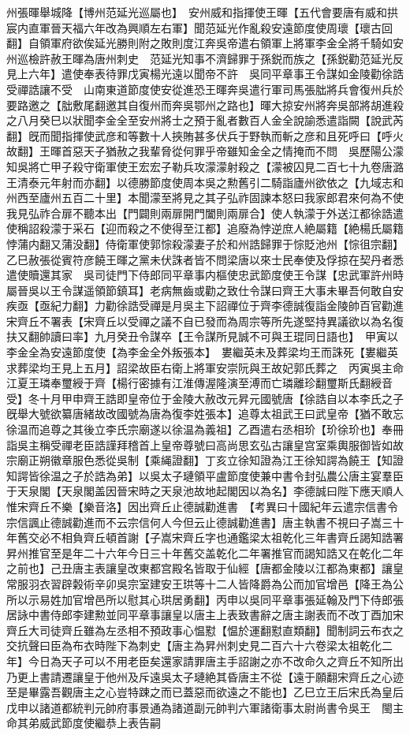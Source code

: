 州張暉舉城降【博州范延光巡屬也】　安州威和指揮使王暉【五代會要唐有威和拱宸内直軍晉天福六年改為興順左右軍】聞范延光作亂殺安遠節度使周瓌【瓌古回翻】自領軍府欲俟延光勝則附之敗則度江奔吳帝遣右領軍上將軍李金全將千騎如安州巡檢許赦王暉為唐州刺史　范延光知事不濟歸罪于孫鋭而族之【孫鋭勸范延光反見上六年】遣使奉表待罪戊寅楊光遠以聞帝不許　吳同平章事王令謀如金陵勸徐誥受禪誥讓不受　山南東道節度使安從進恐王暉奔吳遣行軍司馬張朏將兵會復州兵於要路邀之【朏敷尾翻邀其自復州而奔吳鄂州之路也】暉大掠安州將奔吳部將胡進殺之八月癸巳以狀聞李金全至安州將士之預于亂者數百人金全說諭悉遣詣闕【說武芮翻】旣而聞指揮使武彦和等數十人挾賄甚多伏兵于野執而斬之彦和且死呼曰【呼火故翻】王暉首惡天子猶赦之我輩脅從何罪乎帝雖知金全之情掩而不問　吳歷陽公濛知吳將亡甲子殺守衛軍使王宏宏子勒兵攻濛濛射殺之【濛被囚見二百七十九卷唐潞王清泰元年射而亦翻】以德勝節度使周本吳之勲舊引二騎詣廬州欲依之【九域志和州西至廬州五百二十里】本聞濛至將見之其子弘祚固諫本怒曰我家郎君來何為不使我見弘祚合扉不聽本出【門闢則兩扉開門闔則兩扉合】使人執濛于外送江都徐誥遣使稱詔殺濛于采石【迎而殺之不使得至江都】追廢為悖逆庶人絶屬籍【絶楊氏屬籍悖蒲内翻又蒲没翻】侍衛軍使郭悰殺濛妻子於和州誥歸罪于悰貶池州【悰徂宗翻】　乙巳赦張從賓符彦饒王暉之黨未伏誅者皆不問梁唐以來士民奉使及俘掠在契丹者悉遣使贖還其家　吳司徒門下侍郎同平章事内樞使忠武節度使王令謀【忠武軍許州時屬晉吳以王令謀遥領節鎮耳】老病無齒或勸之致仕令謀曰齊王大事未畢吾何敢自安疾亟【亟紀力翻】力勸徐誥受禪是月吳主下詔禪位于齊李德誠復詣金陵帥百官勸進宋齊丘不署表【宋齊丘以受禪之議不自已發而為周宗等所先遂堅持異議欲以為名復扶又翻帥讀曰率】九月癸丑令謀卒【王令謀所見誠不可與王琨同日語也】　甲寅以李金全為安遠節度使【為李金全外叛張本】　婁繼英未及葬梁均王而誅死【婁繼英求葬梁均王見上五月】詔梁故臣右衛上將軍安崇阮與王故妃郭氏葬之　丙寅吳主命江夏王璘奉璽綬于齊【楊行密據有江淮傳渥隆演至溥而亡璘離珍翻璽斯氏翻綬音受】冬十月甲申齊王誥即皇帝位于金陵大赦改元昇元國號唐【徐誥自以本李氏之子旣舉大號欲纂唐緒故改國號為唐為復李姓張本】追尊太祖武王曰武皇帝【猶不敢忘徐温而追尊之其後立李氏宗廟遂以徐温為義祖】乙酉遣右丞相玠【玠徐玠也】奉冊詣吳主稱受禪老臣誥謹拜稽首上皇帝尊號曰高尚思玄弘古讓皇宫室乘輿服御皆如故宗廟正朔徽章服色悉從吳制【乘䋲證翻】丁亥立徐知證為江王徐知諤為饒王【知證知諤皆徐温之子於誥為弟】以吳太子璉領平盧節度使兼中書令封弘農公唐主宴羣臣于天泉閣【天泉閣盖因晉宋時之天泉池故地起閣因以為名】李德誠曰陛下應天順人惟宋齊丘不樂【樂音洛】因出齊丘止德誠勸進書　【考異曰十國紀年云遣宗信書令宗信諷止德誠勸進而不云宗信何人今但云止德誠勸進書】唐主執書不視曰子嵩三十年舊交必不相負齊丘頓首謝【子嵩宋齊丘字也通鑑梁太祖乾化三年書齊丘謁知誥署昇州推官至是年二十六年今日三十年舊交盖乾化二年署推官而謁知誥又在乾化二年之前也】己丑唐主表讓皇改東都宫殿名皆取于仙經【唐都金陵以江都為東都】讓皇常服羽衣習辟糓術辛卯吳宗室建安王珙等十二人皆降爵為公而加官增邑【降王為公所以示易姓加官增邑所以慰其心珙居勇翻】丙申以吳同平章事張延翰及門下侍郎張居詠中書侍郎李建勲並同平章事讓皇以唐主上表致書辭之唐主謝表而不改丁酉加宋齊丘大司徒齊丘雖為左丞相不預政事心愠懟【愠於運翻懟直類翻】聞制詞云布衣之交抗聲曰臣為布衣時陛下為刺史【唐主為昇州刺史見二百六十六卷梁太祖乾化二年】今日為天子可以不用老臣矣還家請罪唐主手詔謝之亦不改命久之齊丘不知所出乃更上書請遷讓皇于他州及斥遠吳太子璉絶其昏唐主不從【遠于願翻宋齊丘之心迹至是畢露吾觀唐主之心豈特踈之而已蓋惡而欲遠之不能也】乙巳立王后宋氏為皇后戊申以諸道都統判元帥府事景通為諸道副元帥判六軍諸衛事太尉尚書令吳王　閩主命其弟威武節度使繼恭上表告嗣